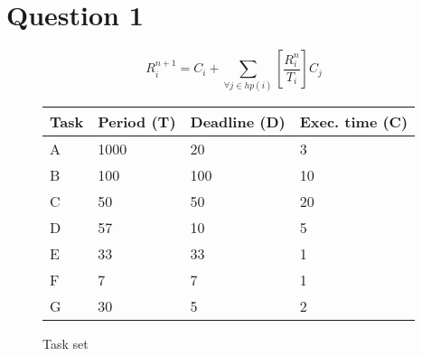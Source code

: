 \section{Question 1}

    $$R_i^{n+1} = C_i + \sum\limits_{\forall j \in hp(i)} \left[\frac{R_i^n}{T_i}\right] C_j$$

    \renewcommand{\arraystretch}{1.4}
        \begin{figure}[H]
        \centering
        \begin{minipage}{0.5\textwidth}
            \begin{table}[H]
            \centering
                \begin{tabular}{|l|l|l|l|}
                \hline
                \rowcolor{green!40}\textbf{Task} & \textbf{Period (T)} & \textbf{Deadline (D)} & \textbf{Exec. time (C)} \\ \hline
                A   & 1000  & 20    & 3     \\ \hline
                B   & 100   & 100   & 10    \\ \hline
                C   & 50    & 50    & 20    \\ \hline
                D   & 57    & 10    & 5     \\ \hline
                E   & 33    & 33    & 1     \\ \hline
                F   & 7     & 7     & 1     \\ \hline
                G   & 30    & 5     & 2     \\ \hline
                \end{tabular}
            \end{table}
        \end{minipage}
        \caption{Task set}
        \label{fig:tasks}
        \end{figure}
    \renewcommand{\arraystretch}{1.0}

